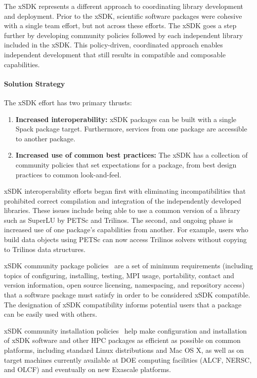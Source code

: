 The xSDK represents a different approach to coordinating library development and deployment.  Prior to the xSDK, scientific software packages were cohesive with a single team effort, but not across these efforts. The xSDK goes a step further by developing community policies followed by each independent library included in the xSDK.  This policy-driven, coordinated approach enables independent development that still results in compatible and composable capabilities.

\paragraph{Solution Strategy}

The xSDK effort has two primary thrusts:
\begin{enumerate}
	\item \textbf{Increased interoperability:} xSDK packages can be built with a single Spack package target.  Furthermore, services from one package are accessible to another package.
	\item \textbf{Increased use of common best practices:}  The xSDK has a collection of community policies that set expectations for a package, from best design practices to common look-and-feel.
\end{enumerate}

xSDK interoperability efforts began first with eliminating incompatibilities that prohibited correct compilation and integration of the independently developed libraries.  These issues include being able to use a common version of a library such as SuperLU by PETSc and Trilinos.  The second, and ongoing phase is increased use of one package's capabilities from another.  For example, users who build data objects using PETSc can now access Trilinos solvers without copying to Trilinos data structures.

xSDK community package policies~\cite{xsdk-policies:homepage,
xSDK-community-package-policies2017} are a set of minimum requirements (including topics of configuring, installing, testing, MPI usage, portability, contact and version information, open source licensing, namespacing, and repository access) that a software package must satisfy in order to be considered xSDK compatible. The designation of xSDK compatibility informs potential users that a package can be easily used with others. 

xSDK community installation policies~\cite{xSDK-community-installation-policies2017} help make configuration and installation of xSDK software and other HPC packages as efficient as possible on common platforms, including standard Linux distributions and Mac OS X, as well as on target machines currently available at DOE computing facilities (ALCF, NERSC, and OLCF) and eventually on new Exascale platforms.

